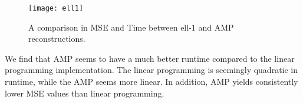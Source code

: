 \documentclass[]{../../ncmathy}
\begin{document}
		\begin{figure}[H]
		\centering\texttt{[image: ell1]}
		\caption{A comparison in MSE and Time between ell-1 and AMP reconstructions.}
		\end{figure}

	We find that AMP seems to have a much better runtime compared to the linear programming implementation. The linear programming is seemingly quadratic in runtime, while the AMP seems more linear. In addition, AMP yields consistently lower MSE values than linear programming.
	
\end{document}
